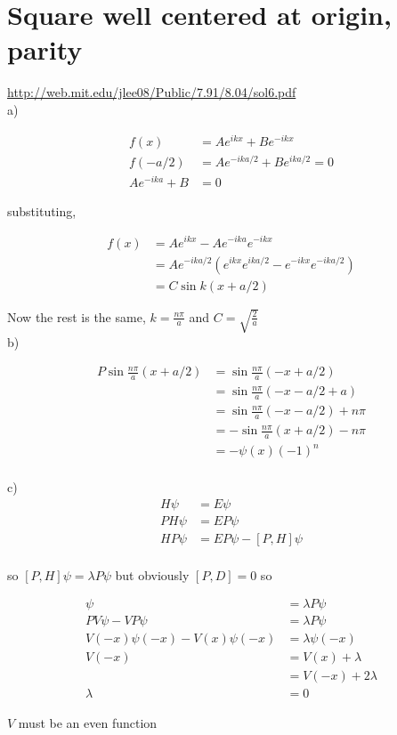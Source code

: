 \documentclass{article}
\newcommand{\<}{\langle}
\renewcommand{\>}{\rangle}
\begin{document}
\section{Square well centered at origin, parity}

\url{http://web.mit.edu/jlee08/Public/7.91/8.04/sol6.pdf}
\\
a)

\begin{align*}
f(x) &= Ae^{ikx} + Be^{-ikx} \\
f(-a/2) &= Ae^{-ika/2} + Be^{ika/2} = 0 \\
Ae^{-ika} + B &= 0
\end{align*}

substituting,

\begin{align*}
f(x) &= Ae^{ikx} - Ae^{-ika}e^{-ikx} \\
&= Ae^{-ika/2}(e^{ikx}e^{ika/2} - e^{-ikx}e^{-ika/2}) \\
&= C\sin k(x+a/2)
\end{align*}

Now the rest is the same, $k = \frac{n\pi}{a}$ and $C = \sqrt{\frac{2}{a}}$
\\
b) 

\begin{align*}
P\sin \frac{n\pi}{a} (x+a/2) &= \sin \frac{n\pi}{a}(-x + a/2) \\
&= \sin \frac{n\pi}{a} (-x-a/2 + a) \\
&= \sin \frac{n\pi}{a} (-x-a/2) + n\pi \\
&= -\sin \frac{n\pi}{a} (x+a/2) - n\pi \\
&= -\psi(x) (-1)^n
\end{align*}
\\
c)
\begin{align*}
H\psi &= E\psi \\
PH\psi &= EP\psi \\
HP\psi &= EP\psi - [P,H]\psi \\
\end{align*}

so $[P,H]\psi = \lambda P\psi$
but obviously $[P,D] = 0$ so

\begin{align*}
[P,V]\psi &= \lambda P\psi \\
PV\psi - VP\psi &= \lambda P\psi \\
V(-x)\psi(-x) - V(x)\psi(-x) &= \lambda \psi(-x) \\
V(-x) &= V(x) + \lambda \\
&= V(-x) + 2\lambda \\
\lambda &= 0
\end{align*}

$V$ must be an even function
\end{document}
